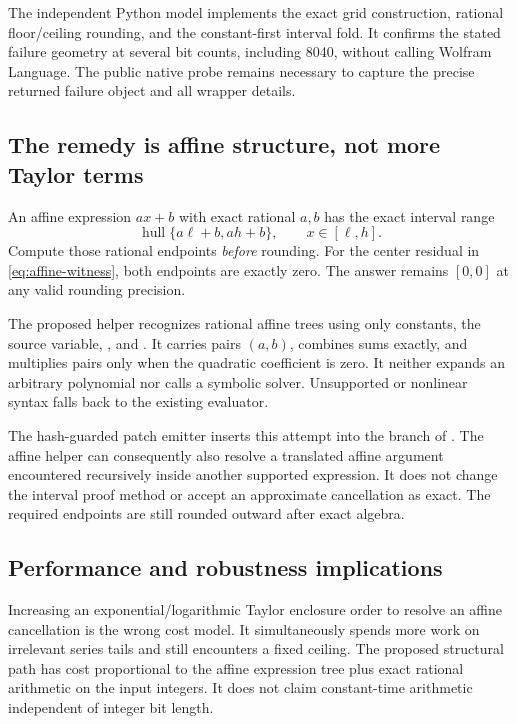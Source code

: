 \documentclass[11pt,a4paper]{article}
\newcommand{\code}[1]{\texttt{\detokenize{#1}}}
\begin{document}
The independent Python model implements the exact grid construction, rational floor/ceiling rounding, and the constant-first interval fold. It confirms the stated failure geometry at several bit counts, including 8040, without calling Wolfram Language. The public native probe remains necessary to capture the precise returned failure object and all wrapper details.

\subsection{The remedy is affine structure, not more Taylor terms}

An affine expression $a x+b$ with exact rational $a,b$ has the exact interval range
\begin{equation}\label{eq:affine-range}
 \operatorname{hull}\{a\ell+b,ah+b\},\qquad x\in[\ell,h].
\end{equation}
Compute those rational endpoints \emph{before} rounding. For the center residual in \eqref{eq:affine-witness}, both endpoints are exactly zero. The answer remains $[0,0]$ at any valid rounding precision.

The proposed helper recognizes rational affine trees using only constants, the source variable, \code{Plus}, and \code{Times}. It carries pairs $(a,b)$, combines sums exactly, and multiplies pairs only when the quadratic coefficient is zero. It neither expands an arbitrary polynomial nor calls a symbolic solver. Unsupported or nonlinear syntax falls back to the existing evaluator.

The hash-guarded patch emitter inserts this attempt into the \code{Plus} branch of \code{certEnclose}. The affine helper can consequently also resolve a translated affine argument encountered recursively inside another supported expression. It does not change the interval proof method or accept an approximate cancellation as exact. The required endpoints are still rounded outward after exact algebra.

\subsection{Performance and robustness implications}

Increasing an exponential/logarithmic Taylor enclosure order to resolve an affine cancellation is the wrong cost model. It simultaneously spends more work on irrelevant series tails and still encounters a fixed ceiling. The proposed structural path has cost proportional to the affine expression tree plus exact rational arithmetic on the input integers. It does not claim constant-time arithmetic independent of integer bit length.
\end{document}
